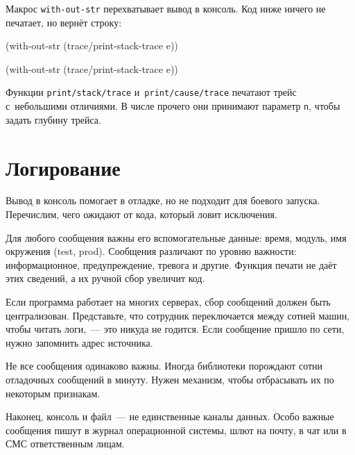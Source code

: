 \fi

Макрос \verb|with-out-str| перехватывает вывод в консоль. Код ниже ничего не
печатает, но вернёт строку:

\ifnarrow

\begin{english}
  \begin{clojure}
(with-out-str
  (trace/print-stack-trace
    e))
  \end{clojure}
\end{english}

\else

\begin{english}
  \begin{clojure}
(with-out-str
  (trace/print-stack-trace e))
  \end{clojure}
\end{english}

\fi

Функции \texttt{print\-/stack\-/trace} и~\texttt{print\-/cause\-/trace} печатают
трейс с~небольшими отличиями. В числе прочего они принимают параметр \verb|n|,
чтобы задать глубину трейса.

\section{Логирование}


Вывод в консоль помогает в отладке, но не подходит для боевого
запуска. Перечислим, чего ожидают от кода, который ловит исключения.

Для любого сообщения важны его вспомогательные данные: время, модуль, имя
окружения (test, prod). Сообщения различают по уровню важности: информационное,
предупреждение, тревога и другие. Функция печати не даёт этих сведений, а их
ручной сбор увеличит код.

Если программа работает на многих серверах, сбор сообщений должен быть
централизован. Представьте, что сотрудник переключается между сотней машин,
чтобы читать логи,~--- это никуда не годится. Если сообщение пришло по сети,
нужно запомнить адрес источника.

Не все сообщения одинаково важны. Иногда библиотеки порождают сотни отладочных
сообщений в минуту. Нужен механизм, чтобы отбрасывать их по некоторым признакам.

Наконец, консоль и файл~--- не единственные каналы данных. Особо важные
сообщения пишут в журнал операционной системы, шлют на почту, в чат или в СМС
ответственным лицам.

